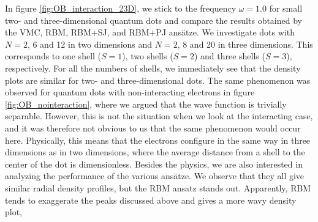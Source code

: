 In figure \eqref{fig:OB_interaction_23D}, we stick to the frequency $\omega=1.0$ for small two- and three-dimensional quantum dots and compare the results obtained by the VMC, RBM, RBM+SJ, and RBM+PJ ansätze. We investigate dots with $N=2$, 6 and 12 in two dimensions and $N=2$, 8 and 20 in three dimensions. This corresponds to one shell ($S=1$), two shells ($S=2$) and three shells ($S=3$), respectively. For all the numbers of shells, we immediately see that the density plots are similar for two- and three-dimensional dots. The same phenomenon was observed for quantum dots with non-interacting electrons in figure \eqref{fig:OB_nointeraction}, where we argued that the wave function is trivially separable. However, this is not the situation when we look at the interacting case, and it was therefore not obvious to us that the same phenomenon would occur here. Physically, this means that the electrons configure in the same way in three dimensions as in two dimensions, where the average distance from a shell to the center of the dot is dimensionless. Besides the physics, we are also interested in analyzing the performance of the various ansätze. We observe that they all give similar radial density profiles, but the RBM ansatz stands out. Apparently, RBM tends to exaggerate the peaks discussed above and gives a more wavy density plot,

